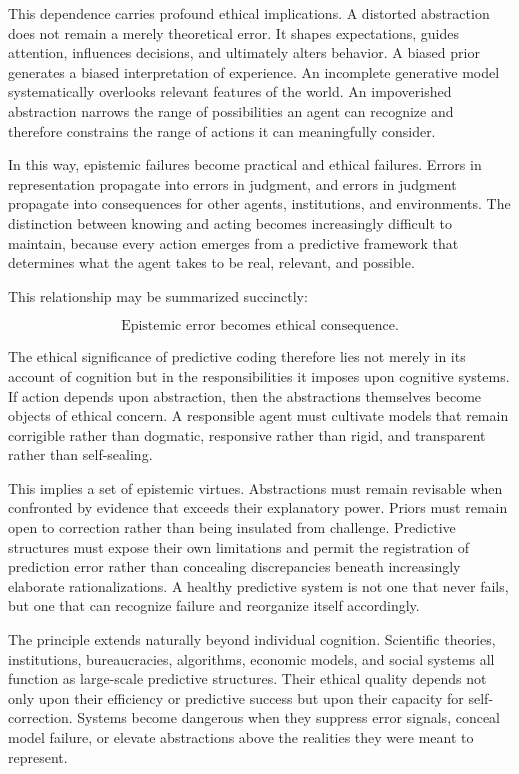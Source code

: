 \documentclass[12pt,letterpaper]{article}
\theoremstyle{remark}
\begin{document}
This dependence carries profound ethical implications. A distorted abstraction does not remain a merely theoretical error. It shapes expectations, guides attention, influences decisions, and ultimately alters behavior. A biased prior generates a biased interpretation of experience. An incomplete generative model systematically overlooks relevant features of the world. An impoverished abstraction narrows the range of possibilities an agent can recognize and therefore constrains the range of actions it can meaningfully consider.

In this way, epistemic failures become practical and ethical failures. Errors in representation propagate into errors in judgment, and errors in judgment propagate into consequences for other agents, institutions, and environments. The distinction between knowing and acting becomes increasingly difficult to maintain, because every action emerges from a predictive framework that determines what the agent takes to be real, relevant, and possible.

This relationship may be summarized succinctly:

\[
\text{Epistemic error becomes ethical consequence.}
\]

The ethical significance of predictive coding therefore lies not merely in its account of cognition but in the responsibilities it imposes upon cognitive systems. If action depends upon abstraction, then the abstractions themselves become objects of ethical concern. A responsible agent must cultivate models that remain corrigible rather than dogmatic, responsive rather than rigid, and transparent rather than self-sealing.

This implies a set of epistemic virtues. Abstractions must remain revisable when confronted by evidence that exceeds their explanatory power. Priors must remain open to correction rather than being insulated from challenge. Predictive structures must expose their own limitations and permit the registration of prediction error rather than concealing discrepancies beneath increasingly elaborate rationalizations. A healthy predictive system is not one that never fails, but one that can recognize failure and reorganize itself accordingly.

The principle extends naturally beyond individual cognition. Scientific theories, institutions, bureaucracies, algorithms, economic models, and social systems all function as large-scale predictive structures. Their ethical quality depends not only upon their efficiency or predictive success but upon their capacity for self-correction. Systems become dangerous when they suppress error signals, conceal model failure, or elevate abstractions above the realities they were meant to represent.
\end{document}

